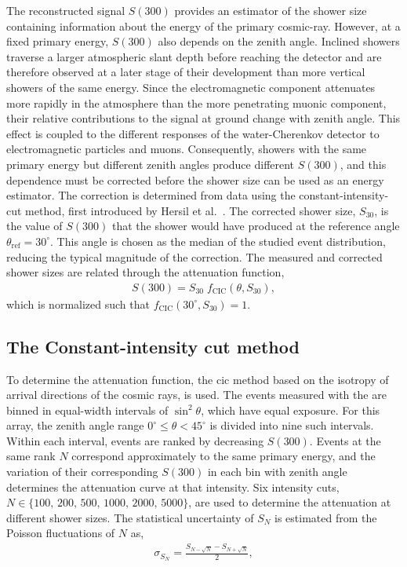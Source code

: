 \documentclass[main.tex]{subfiles}
\begin{document}
The reconstructed signal $S(300)$ provides an estimator of the shower size containing information about the energy of the primary cosmic-ray.
However, at a fixed primary energy, $S(300)$ also depends on the zenith angle.
Inclined showers traverse a larger atmospheric slant depth before reaching the detector and are therefore observed at a later stage of their development than more vertical showers of the same energy.
Since the electromagnetic component attenuates more rapidly in the atmosphere than the more penetrating muonic component, their relative contributions to the signal at ground change with zenith angle.
This effect is coupled to the different responses of the water-Cherenkov detector to electromagnetic particles and muons.
Consequently, showers with the same primary energy but different zenith angles produce different $S(300)$, and this dependence must be corrected before the shower size can be used as an energy estimator.
The correction is determined from data using the constant-intensity-cut method, first introduced by Hersil et al.~\cite{Hirsil:1961:CIC}.
The corrected shower size, $S_{30}$, is the value of $S(300)$ that the shower would have produced at the reference angle $\theta_{\text{ref}}=30^\circ$.
This angle is chosen as the median of the studied event distribution, reducing the typical magnitude of the correction.
The measured and corrected shower sizes are related through the attenuation function,
\begin{align}
    S(300)=S_{30} \; f_{\text{CIC}}(\theta,S_{30}),
    \label{eq:attenuation}
\end{align}
which is normalized such that $f_{\text{CIC}}(30^\circ,S_{30})=1$.

\subsection{The Constant-intensity cut method}
\label{subsec:cic_method}
To determine the attenuation function, the \gls{cic} method based on the isotropy of arrival directions of the cosmic rays, is used.
The events measured with the  are binned in equal-width intervals of $\sin^2\theta$, which have equal exposure.
For this array, the zenith angle range $0^\circ\leq\theta<45^\circ$ is divided into nine such intervals.
Within each interval, events are ranked by decreasing $S(300)$.
Events at the same rank $N$ correspond approximately to the same primary energy, and the variation of their corresponding $S(300)$ in each bin with zenith angle determines the attenuation curve at that intensity.
Six intensity cuts, $N\in\{100,\,200,\,500,\,1000,\,2000,\,5000\}$, are used to determine the attenuation at different shower sizes.
The statistical uncertainty of $S_N$ is estimated from the Poisson fluctuations of $N$ as,
\begin{align}
    \sigma_{S_N}
    =
    \frac{S_{N-\sqrt{N}}-S_{N+\sqrt{N}}}{2},
\end{align}
\end{document}
